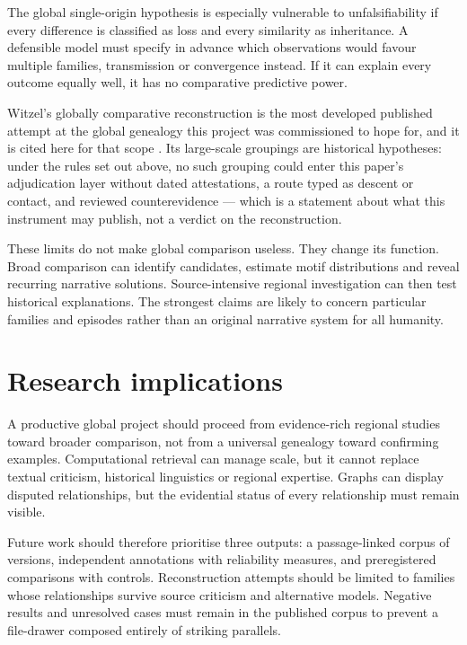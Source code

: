 \documentclass[11pt]{article}
\DeclareRobustCommand{\_}{\textunderscore\allowbreak}
\begin{document}
The global single-origin hypothesis is especially vulnerable to unfalsifiability if
every difference is classified as loss and every similarity as inheritance. A
defensible model must specify in advance which observations would favour multiple
families, transmission or convergence instead. If it can explain every outcome
equally well, it has no comparative predictive power.

Witzel's globally comparative reconstruction is the most developed published attempt at
the global genealogy this project was commissioned to hope for, and it is cited here for
that scope \citep{witzel2012}. Its large-scale groupings are historical hypotheses: under
the rules set out above, no such grouping could enter this paper's adjudication layer
without dated attestations, a route typed as descent or contact, and reviewed
counterevidence --- which is a statement about what this instrument may publish, not a
verdict on the reconstruction.

These limits do not make global comparison useless. They change its function.
Broad comparison can identify candidates, estimate motif distributions and reveal
recurring narrative solutions. Source-intensive regional investigation can then
test historical explanations. The strongest claims are likely to concern particular
families and episodes rather than an original narrative system for all humanity.

\section{Research implications}

A productive global project should proceed from evidence-rich regional studies
toward broader comparison, not from a universal genealogy toward confirming
examples. Computational retrieval can manage scale, but it cannot replace textual
criticism, historical linguistics or regional expertise. Graphs can display
disputed relationships, but the evidential status of every relationship must
remain visible.

Future work should therefore prioritise three outputs: a passage-linked corpus of
versions, independent annotations with reliability measures, and preregistered
comparisons with controls. Reconstruction attempts should be limited to families
whose relationships survive source criticism and alternative models. Negative
results and unresolved cases must remain in the published corpus to prevent a
file-drawer composed entirely of striking parallels.
\end{document}
